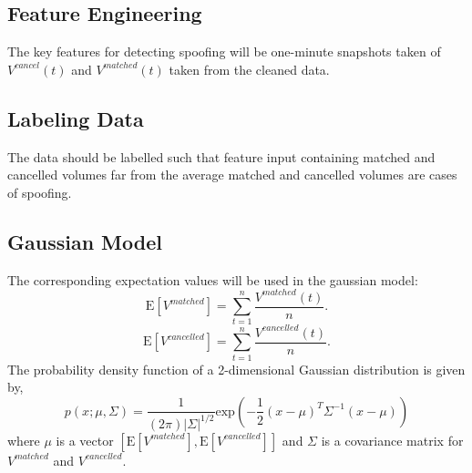 \documentclass[12pt]{article}
\begin{document}
\subsection{Feature Engineering}
The key features for detecting spoofing will be one-minute snapshots taken  of $V^{cancel}(t)$ and $V^{matched}(t)$ taken from the cleaned data.  
\subsection{Labeling Data}
The data should be labelled such that feature input containing matched and cancelled volumes far from the average matched and cancelled volumes are cases of spoofing. 
\subsection{Gaussian Model}
The corresponding expectation values will be used in the gaussian model:
\begin{equation}
\textrm{E}[V^{matched}] = \sum_{t=1}^{n} \frac{V^{matched}(t)}{n}.
\end{equation}
\begin{equation}
\textrm{E}[V^{cancelled}] = \sum_{t=1}^{n} \frac{V^{cancelled}(t)}{n}.
\end{equation}
The probability density function of a 2-dimensional Gaussian distribution is given by,
\begin{equation}
p(x; \mu, \Sigma) = \frac{1}{(2\pi)|\Sigma|^{1/2}} \textrm{exp} (-\frac{1}{2}(x-\mu)^T\Sigma^{-1} (x- \mu))
\end{equation}
where $\mu$ is a vector $[\textrm{E}[V^{matched}] , \textrm{E}[V^{cancelled}]]$ and $\Sigma$ is a covariance matrix for $V^{matched}$ and $V^{cancelled}$. 
\end{document}
